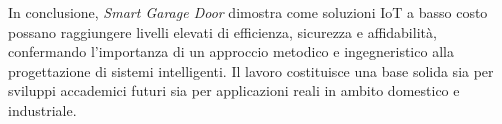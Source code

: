 In conclusione, \textit{Smart Garage Door} dimostra come soluzioni IoT a basso costo possano raggiungere livelli elevati di efficienza, sicurezza e affidabilità, confermando l'importanza di un approccio metodico e ingegneristico alla progettazione di sistemi intelligenti. Il lavoro costituisce una base solida sia per sviluppi accademici futuri sia per applicazioni reali in ambito domestico e industriale.